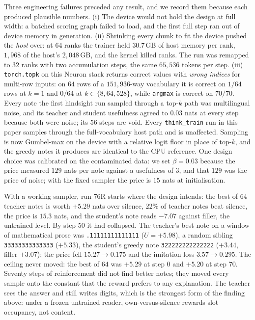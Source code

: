 \documentclass{article} %
\begin{document}
Three engineering failures preceded any result, and we record them because each produced plausible numbers.
(i) The device would not hold the design at full width: a batched scoring graph failed to load, and the
first full step ran out of device memory in generation. (ii) Shrinking every chunk to fit the device pushed
the \emph{host} over: at $64$ ranks the trainer held $30.7$\,GB of host memory per rank, $1{,}968$ of the
host's $2{,}048$\,GB, and the kernel killed ranks. The run was remapped to $32$ ranks with two accumulation
steps, the same $65{,}536$ tokens per step. (iii) \texttt{torch.topk} on this Neuron stack returns correct
values with \emph{wrong indices} for multi-row inputs: on $64$ rows of a $151{,}936$-way vocabulary it is
correct on $1/64$ rows at $k=1$ and $0/64$ at $k \in \{8, 64, 528\}$, while \texttt{argmax} is correct on
$70/70$. Every note the first hindsight run sampled through a top-$k$ path was multilingual noise, and its
teacher and student usefulness agreed to $0.03$ nats at every step because both were noise; its $56$ steps
are void. Every \texttt{think\_train} run in this paper samples through the full-vocabulary host path and is
unaffected. Sampling is now Gumbel-max on the device with a relative logit floor in place of top-$k$, and the
greedy notes it produces are identical to the CPU reference. One design choice was calibrated on the
contaminated data: we set $\beta = 0.03$ because the price measured $129$ nats per note against a
usefulness of $3$, and that $129$ was the price of noise; with the fixed sampler the price is $15$ nats at
initialisation.

With a working sampler, run 76R starts where the design intends: the best of $64$ teacher notes is worth
$+5.29$ nats over silence, $22\%$ of teacher notes beat silence, the price is $15.3$ nats, and the student's
note reads $-7.07$ against filler, the untrained level. By step 50 it had collapsed. The teacher's best note on
a window of mathematical prose was \texttt{.11111111111111} ($U = +5.98$), a random sibling
\texttt{33333333333333} ($+5.33$), the student's greedy note \texttt{322222222222222} ($+3.44$, filler
$+3.07$); the price fell $15.27 \to 0.175$ and the imitation loss $3.57 \to 0.295$. The ceiling never moved:
the best of $64$ was $+5.29$ at step 0 and $+5.20$ at step 70. Seventy steps of reinforcement did not find
better notes; they moved every sample onto the constant that the reward prefers to any explanation. The
teacher sees the answer and still writes digits, which is the strongest form of the finding above: under a
frozen untrained reader, own-versus-silence rewards slot occupancy, not content.
\end{document}
